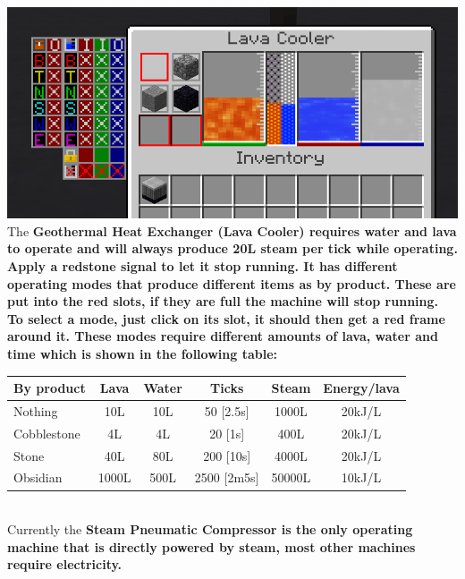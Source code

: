 \documentclass[11pt]{article} %
\begin{document}
\includegraphics[width = \textwidth]{lavaCooler}
The \bf Geothermal Heat Exchanger \rm (Lava Cooler) requires water and lava to operate and will always produce 20L steam per tick while operating. Apply a redstone signal to let it stop running. It has different operating modes that produce different items as by product. These are put into the red slots, if they are full the machine will stop running. To select a mode, just click on its slot, it should then get a red frame around it. These modes require different amounts of lava, water and time which is shown in the following table:\\
\begin{tabular}{| l | c | c | c | c | c |}
\hline
\bf By product & \bf Lava & \bf Water & \bf Ticks & \bf Steam & \bf Energy/lava \\
\hline
Nothing & 10L & 10L & 50 [2.5s] & 1000L & 20kJ/L \\
Cobblestone & 4L & 4L & 20 [1s] & 400L & 20kJ/L \\
Stone & 40L & 80L & 200 [10s] & 4000L & 20kJ/L \\
Obsidian & 1000L & 500L & 2500 [2m5s] & 50000L & 10kJ/L \\
\hline
\end{tabular} \\
Currently the \bf Steam Pneumatic Compressor \rm is the only operating machine that is directly powered by steam, most other machines require electricity.
\end{document}
